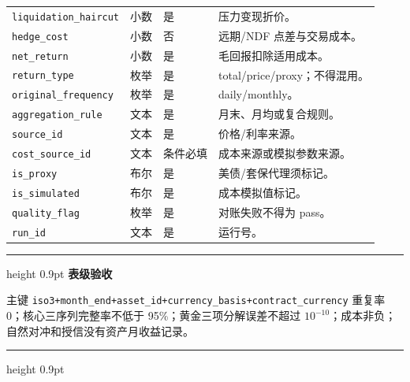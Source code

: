 \documentclass[UTF8,fontset=windows,12pt,openany]{ctexbook}
\newenvironment{gatebox}[1][]{%
  \par\medskip\noindent\begin{center}\begin{minipage}{0.93\textwidth}%
  \color{GoldLine}\hrule height 0.9pt\vspace{0.45em}%
  \textbf{#1}\par\smallskip\color{black}%
}{%
  \par\vspace{0.35em}\color{GoldLine}\hrule height 0.9pt%
  \end{minipage}\end{center}\medskip%
}
\newcommand{\Field}[1]{{\small\nolinkurl{#1}}}
\begin{document}
\begin{longtable}{p{3.8cm}p{2.3cm}p{2.1cm}p{5.0cm}}
\Field{liquidation_haircut} & 小数 & 是 & 压力变现折价。\\
\Field{hedge_cost} & 小数 & 否 & 远期/NDF 点差与交易成本。\\
\Field{net_return} & 小数 & 是 & 毛回报扣除适用成本。\\
\Field{return_type} & 枚举 & 是 & total/price/proxy；不得混用。\\
\Field{original_frequency} & 枚举 & 是 & daily/monthly。\\
\Field{aggregation_rule} & 文本 & 是 & 月末、月均或复合规则。\\
\Field{source_id} & 文本 & 是 & 价格/利率来源。\\
\Field{cost_source_id} & 文本 & 条件必填 & 成本来源或模拟参数来源。\\
\Field{is_proxy} & 布尔 & 是 & 美债/套保代理须标记。\\
\Field{is_simulated} & 布尔 & 是 & 成本模拟值标记。\\
\Field{quality_flag} & 枚举 & 是 & 对账失败不得为 pass。\\
\Field{run_id} & 文本 & 是 & 运行号。\\
\bottomrule
\end{longtable}

\begin{gatebox}[表级验收]
主键 \Field{iso3+month_end+asset_id+currency_basis+contract_currency} 重复率 0；核心三序列完整率不低于 95\%；黄金三项分解误差不超过 \(10^{-10}\)；成本非负；自然对冲和授信没有资产月收益记录。
\end{gatebox}
\end{document}
